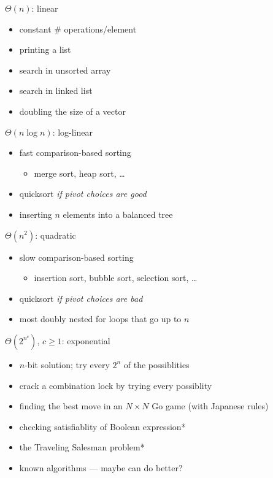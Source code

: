 \begin{frame}{$\Theta(n)$: linear}
    \begin{itemize}
        \item constant \# operations/element
            \vspace{.5cm}
        \item printing a list
        \item search in unsorted array
        \item search in linked list
        \item doubling the size of a vector
    \end{itemize}
\end{frame}

\begin{frame}{$\Theta(n \log n)$: log-linear}
    \begin{itemize}
        \item fast comparison-based sorting 
            \begin{itemize}
            \item merge sort, heap sort, \ldots
            \end{itemize}
        \item quicksort \textit{if pivot choices are good}
        \item inserting $n$ elements into a balanced tree
    \end{itemize}
\end{frame}

\begin{frame}{$\Theta(n^2)$: quadratic}
    \begin{itemize}
        \item slow comparison-based sorting
            \begin{itemize}
            \item insertion sort, bubble sort, selection sort, \ldots
            \end{itemize}
        \item quicksort \textit{if pivot choices are bad}
        \item most doubly nested for loops that go up to $n$
    \end{itemize}
\end{frame}

\begin{frame}{$\Theta(2^{n^c})$, $c\ge1$: exponential}
    \begin{itemize}
        \item $n$-bit solution; try every $2^n$ of the possiblities
            \vspace{.5cm}
        \item crack a combination lock by trying every possiblity
        \item finding the best move in an $N\times N$ Go game (with Japanese rules)
        \item checking satisfiablity of Boolean expression*
        \item the Traveling Salesman problem*
        \item {\scriptsize *known algorithms --- maybe can do better?}
    \end{itemize}
\end{frame}

